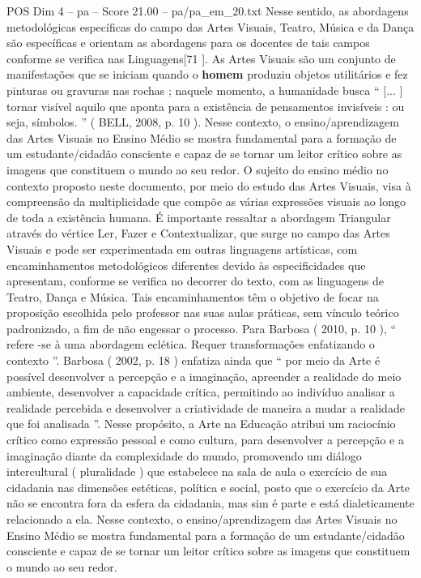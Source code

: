 \begin{textsample}{POS Dim 4 – pa – Score 21.00 – pa/pa\_em\_20.txt}
Nesse sentido, as abordagens metodológicas específicas do campo das Artes Visuais, Teatro, Música e da Dança são específicas e orientam as abordagens para os docentes de tais campos conforme se verifica nas Linguagens[71 ].
As Artes Visuais são um conjunto de manifestações que se iniciam quando o \textbf{homem} produziu objetos utilitários e fez pinturas ou gravuras nas rochas ; naquele momento, a humanidade busca “ [... ] tornar visível aquilo que aponta para a existência de pensamentos invisíveis : ou seja, símbolos. ” ( BELL, 2008, p. 10 ).
Nesse contexto, o ensino/aprendizagem das Artes Visuais no Ensino Médio se mostra fundamental para a formação de um estudante/cidadão consciente e capaz de se tornar um leitor crítico sobre as imagens que constituem o mundo ao seu redor.
O sujeito do ensino médio no contexto proposto neste documento, por meio do estudo das Artes Visuais, visa à compreensão da multiplicidade que compõe as várias expressões visuais ao longo de toda a existência humana.
É importante ressaltar a abordagem Triangular através do vértice Ler, Fazer e Contextualizar, que surge no campo das Artes Visuais e pode ser experimentada em outras linguagens artísticas, com encaminhamentos metodológicos diferentes devido às especificidades que apresentam, conforme se verifica no decorrer do texto, com as linguagens de Teatro, Dança e Música.
Tais encaminhamentos têm o objetivo de focar na proposição escolhida pelo professor nas suas aulas práticas, sem vínculo teórico padronizado, a fim de não engessar o processo.
Para Barbosa ( 2010, p. 10 ), “ refere -se à uma abordagem eclética.
Requer transformações enfatizando o contexto ”.
Barbosa ( 2002, p. 18 ) enfatiza ainda que “ por meio da Arte é possível desenvolver a percepção e a imaginação, apreender a realidade do meio ambiente, desenvolver a capacidade crítica, permitindo ao indivíduo analisar a realidade percebida e desenvolver a criatividade de maneira a mudar a realidade que foi analisada ”.
Nesse propósito, a Arte na Educação atribui um raciocínio crítico como expressão pessoal e como cultura, para desenvolver a percepção e a imaginação diante da complexidade do mundo, promovendo um diálogo intercultural ( pluralidade ) que estabelece na sala de aula o exercício de sua cidadania nas dimensões estéticas, política e social, posto que o exercício da Arte não se encontra fora da esfera da cidadania, mas sim é parte e está dialeticamente relacionado a ela.
Nesse contexto, o ensino/aprendizagem das Artes Visuais no Ensino Médio se mostra fundamental para a formação de um estudante/cidadão consciente e capaz de se tornar um leitor crítico sobre as imagens que constituem o mundo ao seu redor.

\end{textsample}
